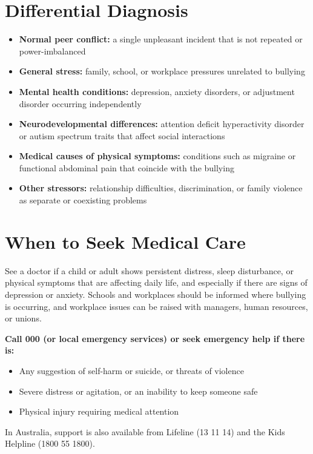 \section*{Differential Diagnosis}
\begin{itemize}
    \item \textbf{Normal peer conflict:} a single unpleasant incident that is not repeated or power-imbalanced
    \item \textbf{General stress:} family, school, or workplace pressures unrelated to bullying
    \item \textbf{Mental health conditions:} depression, anxiety disorders, or adjustment disorder occurring independently
    \item \textbf{Neurodevelopmental differences:} attention deficit hyperactivity disorder or autism spectrum traits that affect social interactions
    \item \textbf{Medical causes of physical symptoms:} conditions such as migraine or functional abdominal pain that coincide with the bullying
    \item \textbf{Other stressors:} relationship difficulties, discrimination, or family violence as separate or coexisting problems
\end{itemize}

\section*{When to Seek Medical Care}
See a doctor if a child or adult shows persistent distress, sleep disturbance, or physical symptoms that are affecting daily life, and especially if there are signs of depression or anxiety. Schools and workplaces should be informed where bullying is occurring, and workplace issues can be raised with managers, human resources, or unions.

\textbf{Call 000 (or local emergency services) or seek emergency help if there is:}
\begin{itemize}
    \item Any suggestion of self-harm or suicide, or threats of violence
    \item Severe distress or agitation, or an inability to keep someone safe
    \item Physical injury requiring medical attention
\end{itemize}

In Australia, support is also available from Lifeline (13 11 14) and the Kids Helpline (1800 55 1800).

